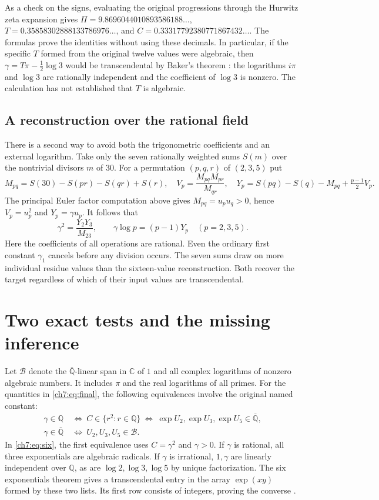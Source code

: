\documentclass[11pt,a4paper,oneside,openany]{report}
\theoremstyle{remark}\newtheorem{remark}[theorem]{Remark}
\numberwithin{equation}{section}
\newcommand{\A}{\overline{\mathbb Q}}\newcommand{\B}{\mathcal B}
\begin{document}
As a check on the signs, evaluating the original progressions through the Hurwitz zeta expansion gives $\Pi=9.8696044010893586188\ldots$, $T=0.35858302888133786976\ldots$, and $C=0.33317792380771867432\ldots$. The formulas prove the identities without using these decimals. In particular, if the specific $T$ formed from the original twelve values were algebraic, then $\gamma=T\pi-\tfrac12\log3$ would be transcendental by Baker's theorem \cite{baker}: the logarithms $i\pi$ and $\log3$ are rationally independent and the coefficient of $\log3$ is nonzero. The calculation has not established that $T$ is algebraic.

\subsection*{A reconstruction over the rational field}
There is a second way to avoid both the trigonometric coefficients and an external logarithm. Take only the seven rationally weighted sums $S(m)$ over the nontrivial divisors $m$ of $30$. For a permutation $(p,q,r)$ of $(2,3,5)$ put
\[
 M_{pq}=S(30)-S(pr)-S(qr)+S(r),\quad
 V_p=\frac{M_{pq}M_{pr}}{M_{qr}},\quad
 Y_p=S(pq)-S(q)-M_{pq}+\tfrac{p-1}{2}V_p .
\]
The principal Euler factor computation above gives $M_{pq}=u_pu_q>0$, hence $V_p=u_p^2$ and $Y_p=\gamma u_p$. It follows that
\[
 \gamma^2=\frac{Y_2Y_3}{M_{23}},\qquad \gamma\log p=(p-1)Y_p\quad(p=2,3,5).
\]
Here the coefficients of all operations are rational. Even the ordinary first constant $\gamma_1$ cancels before any division occurs. The seven sums draw on more individual residue values than the sixteen-value reconstruction. Both recover the target regardless of which of their input values are transcendental.

\section{Two exact tests and the missing inference}
Let $\B$ denote the $\A$-linear span in $\mathbb C$ of $1$ and all complex logarithms of nonzero algebraic numbers. It includes $\pi$ and the real logarithms of all primes. For the quantities in \eqref{ch7:eq:final}, the following equivalences involve the original named constant:
\begin{align}
 \gamma\in\mathbb Q
 &\ \Longleftrightarrow\ C\in\{r^2:r\in\mathbb Q\}
 \ \Longleftrightarrow\ \exp U_2,\exp U_3,\exp U_5\in\A,\label{ch7:eq:six}\\
 \gamma\in\A
 &\ \Longleftrightarrow\ U_2,U_3,U_5\in\B.\label{ch7:eq:roy}
\end{align}
In \eqref{ch7:eq:six}, the first equivalence uses $C=\gamma^2$ and $\gamma>0$. If $\gamma$ is rational, all three exponentials are algebraic radicals. If $\gamma$ is irrational, $1,\gamma$ are linearly independent over $\mathbb Q$, as are $\log2,\log3,\log5$ by unique factorization. The six exponentials theorem gives a transcendental entry in the array $\exp(xy)$ formed by these two lists. Its first row consists of integers, proving the converse \cite{pila}.
\end{document}
